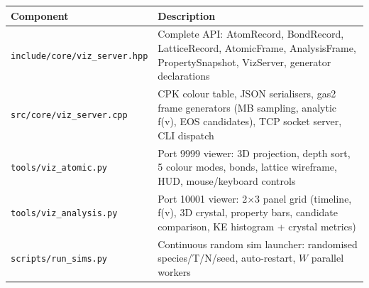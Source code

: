 ﻿\documentclass[11pt]{article}
\begin{document}
\begin{center}
\begin{tabular}{lp{9cm}}
\toprule
Component & Description \\
\midrule
\texttt{include/core/viz\_server.hpp}
  & Complete API: AtomRecord, BondRecord, LatticeRecord, AtomicFrame,
    AnalysisFrame, PropertySnapshot, VizServer, generator declarations \\
\addlinespace
\texttt{src/core/viz\_server.cpp}
  & CPK colour table, JSON serialisers, gas2 frame generators (MB sampling,
    analytic f(v), EOS candidates), TCP socket server, CLI dispatch \\
\addlinespace
\texttt{tools/viz\_atomic.py}
  & Port 9999 viewer: 3D projection, depth sort, 5 colour modes, bonds,
    lattice wireframe, HUD, mouse/keyboard controls \\
\addlinespace
\texttt{tools/viz\_analysis.py}
  & Port 10001 viewer: 2$\times$3 panel grid (timeline, f(v), 3D crystal,
    property bars, candidate comparison, KE histogram + crystal metrics) \\
\addlinespace
\texttt{scripts/run\_sims.py}
  & Continuous random sim launcher: randomised species/T/N/seed,
    auto-restart, $W$ parallel workers \\
\bottomrule
\end{tabular}
\end{center}
\end{document}
